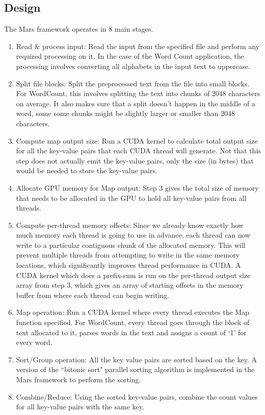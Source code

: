 \documentclass{article}
\begin{document}
\subsection{Design} \label{mars-design-summary}
The Mars framework operates in 8 main stages. 
\begin{enumerate}
    \item Read \& process input: Read the input from the specified file and perform any required processing on it. In the case of the Word Count application, the processing involves converting all alphabets in the input text to uppercase. 
    \item Split file blocks: Split the preprocessed text from the file into small blocks. For WordCount, this involves splitting the text into chunks of 2048 characters on average. It also makes sure that a split doesn't happen in the middle of a word, some some chunks might be slightly larger or smaller than 2048 characters.
    \item Compute map output size: Run a CUDA kernel to calculate total output size for all the key-value pairs that each CUDA thread will generate. Not that this step does not actually emit the key-value pairs, only the size (in bytes) that would be needed to store the key-value pairs. 
    \item Allocate GPU memory for Map output: Step 3 gives the total size of memory that needs to be allocated in the GPU to hold all key-value pairs from all threads. 
    \item Compute per-thread memory offsets: Since we already know exactly how much memory each thread is going to use in advance, each thread can now write to a particular contiguous chunk of the allocated memory. This will prevent multiple threads from attempting to write in the same memory locations, which significantly improves thread performance in CUDA. A CUDA kernel which does a prefix-sum is run on the per-thread output size array from step 3, which gives an array of starting offsets in the memory buffer from where each thread can begin writing. 
    \item Map operation: Run a CUDA kernel where every thread executes the Map function specified. For WordCount, every thread goes through the block of text allocated to it, parses words in the text and assigns a count of `1' for every word.
    \item Sort/Group operation: All the key value pairs are sorted based on the key. A version of the ``bitonic sort" parallel sorting algorithm \cite{bitonic_sort} is implemented in the Mars framework to perform the sorting.
    \item Combine/Reduce: Using the sorted key-value pairs, combine the count values for all key-value pairs with the same key.
\end{enumerate}
\end{document}
